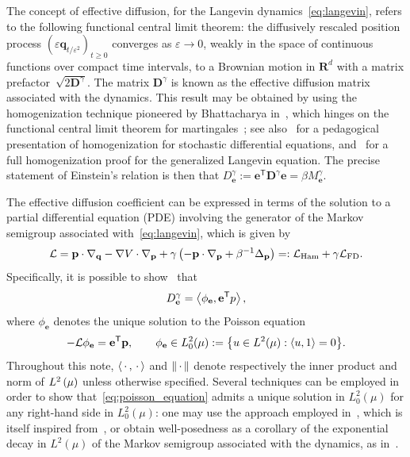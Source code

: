 \documentclass[11pt,a4paper]{article}
\newcommand{\laplacian}{\Delta}
\newcommand{\dummy}{\,\cdot\,}
\newcommand{\real}{\mathbf R}
\newcommand{\grad}{\nabla}
\newcommand{\vect}[1]{\boldsymbol{\mathbf #1}}
\newcommand{\mat}[1]{\vect #1}
\renewcommand{\t}{\mathsf T}
\theoremstyle{plain}
\numberwithin{equation}{section}
\renewcommand{\geq}{\geqslant}
\begin{document}
The concept of effective diffusion,
for the Langevin dynamics~\eqref{eq:langevin},
refers to the following functional central limit theorem:
the diffusively rescaled position process $(\varepsilon \vect q_{t/\varepsilon^2})_{t\geq0}$ converges as $\varepsilon \to 0$,
weakly in the space of continuous functions over compact time intervals,
to a Brownian motion in $\real^d$ with a matrix prefactor~$\sqrt{2 \mat D^{\gamma}}$.
The matrix $\mat D^{\gamma}$ is known as the effective diffusion matrix associated with the dynamics.
This result may be obtained by using the homogenization technique pioneered by Bhattacharya in~\cite{MR663900},
which hinges on the functional central limit theorem for martingales~\cite{MR668684};
see also~\cite[Chapter 18]{pavliotis2008multiscale} for a pedagogical presentation of homogenization for stochastic differential equations,
and~\cite[Theorem 2.5]{MR2793823} for a full homogenization proof for the generalized Langevin equation.
The precise statement of Einstein's relation is then that $D^{\gamma}_{\vect e} := \vect e^\t \mat D^{\gamma} \vect e = \beta M^{\gamma}_{\vect e}$.

The effective diffusion coefficient
can be expressed in terms of the solution to a partial differential equation (PDE) involving the generator of the Markov semigroup associated with~\eqref{eq:langevin},
which is given by
\begin{equation}
    \label{eq:decomposition_generator}
    \mathcal L
    = \vect p \cdot \grad_{\vect q} - \grad V \cdot \grad_{\vect p} + \gamma \left( - \vect p \cdot \grad_{\vect p} + \beta^{-1} \laplacian_{\vect p} \right)
    =: \mathcal L_{\rm Ham} + \gamma \mathcal L_{\rm FD}.
\end{equation}
Specifically, it is possible to show~\cite{MR663900} that
\begin{equation}
    \label{eq:effective_diffusion_poisson}
    D^{\gamma}_{\vect e} = \ip{\phi_{\vect e}}{\vect e^\t p},
\end{equation}
where $\phi_{\vect e}$ denotes the unique solution to the Poisson equation
\begin{equation}
    \label{eq:poisson_equation}
    - \mathcal L \phi_{\vect e} = \vect e^\t \vect p,
    \qquad \phi_{\vect e} \in L^2_0(\mu) := \bigl\{ u \in L^2(\mu): \ip{u}{1} = 0 \bigr\}.
\end{equation}
Throughout this note,
$\ip{\dummy}{\dummy}$ and $\norm{\dummy}$ denote respectively the inner product and norm of $\lp{2}{\mu}$
unless otherwise specified.
Several techniques can be employed in order to show that~\eqref{eq:poisson_equation} admits a unique solution in $L^2_0(\mu)$
for any right-hand side in $L^2_0(\mu)$:
one may use the approach employed in~\cite[Proposition 5.1]{MR2793823},
which is itself inspired from~\cite[Lemma 2.1]{MR812349},
or obtain well-posedness as a corollary of the exponential decay in $L^2(\mu)$ of the Markov semigroup associated with the dynamics,
as in~\cite[Corollary 1]{roussel2018spectral}.
\end{document}
